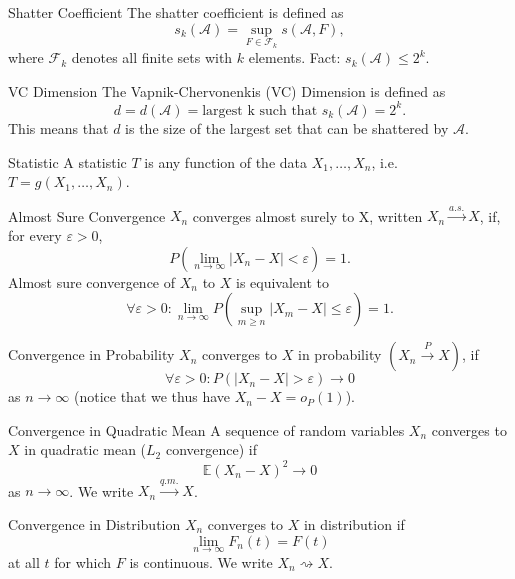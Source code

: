 \documentclass[avery5371,grid]{flashcards}
\begin{document}
\begin{flashcard}[Definition]{Shatter Coefficient}
 The shatter coefficient is defined as
 \[
 s_k(\mathcal{A}) = \sup_{F\in \mathcal{F}_k} s(\mathcal{A},F),
 \]
where $\mathcal{F}_k$ denotes all finite sets with $k$ elements. 
Fact: $s_k(\mathcal{A}) \le 2^k$. 
\end{flashcard}



\begin{flashcard}[Definition]{VC Dimension}
 The Vapnik-Chervonenkis (VC) Dimension is defined as
 \[
 d = d(\mathcal{A}) = \text{largest k such that } s_k(\mathcal{A}) = 2^k.
 \]
This means that $d$ is the size of the largest set that can be shattered by $\mathcal{A}$.
\end{flashcard}

\begin{flashcard}[Definition]{Statistic}
A statistic $T$ is any function of the data $X_1, \ldots, X_n$, i.e. $T=g(X_1,\ldots,X_n)$.
\end{flashcard}

\begin{flashcard}[Definition]{Almost Sure Convergence}
$X_n$ converges almost surely to X, written $X_n \overset{a.s.}{\longrightarrow} X$, if, for every $\varepsilon > 0$, 
\[
P\left( \lim_{n \to \infty} \left| X_n - X \right| < \varepsilon \right) = 1.
\]
Almost sure convergence of $X_n$ to $X$ is equivalent to 
\[
\forall \varepsilon > 0: \lim_{n \to \infty} P\left( \sup_{m \ge n} \left| X_m - X \right| \le \varepsilon \right) = 1.
\]
\end{flashcard}

\begin{flashcard}[Definition]{Convergence in Probability}
$X_n$ converges to $X$ in probability $(X_n \overset{P}{\longrightarrow} X)$, if
\[
\forall \varepsilon > 0: P\left( \left| X_n - X \right| > \varepsilon \right) \to 0
\]
as $n \to \infty$ (notice that we thus have $X_n - X = o_P(1)$).
\end{flashcard}

\begin{flashcard}[Definition]{Convergence in Quadratic Mean}
A sequence of random variables $X_n$ converges to $X$ in quadratic mean ($L_2$ convergence) if 
\[
\mathbb{E}(X_n - X)^2 \to 0
\]
as $n \to \infty$. We write $X_n \overset{q.m.}{\longrightarrow} X$.
\end{flashcard}

\begin{flashcard}[Definition]{Convergence in Distribution}
 $X_n$ converges to $X$ in distribution if 
 \[
 \lim_{n \to \infty} F_n(t) = F(t)
 \]
 at all $t$ for which $F$ is continuous. We write $X_n \rightsquigarrow X$.
\end{flashcard}
\end{document}
